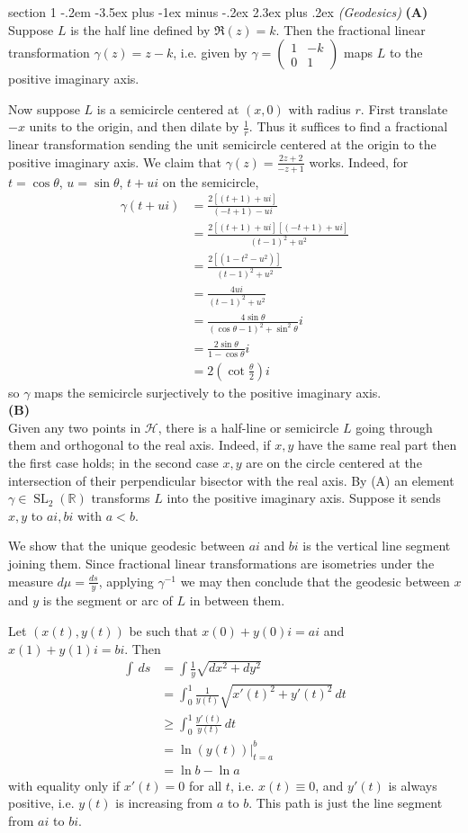 \documentclass[12pt]{article}
\makeatletter
\theoremstyle{norm}
\newcommand{\R}[0]{\mathbb{R}}
\newcommand{\rc}[1]{\frac{1}{#1}}
\newcommand{\ga}[0]{\gamma}
\newcommand{\pa}[1]{\left( {#1} \right)}
\newcommand{\subprob}[1]{\noindent\textbf{#1}\\}
\newcommand{\SL}{\operatorname{SL}}
\newenvironment{problem}{\@startsection
       {section}
       {1}
       {-.2em}
       {-3.5ex plus -1ex minus -.2ex}
       {2.3ex plus .2ex}
       {\pagebreak[3]%
       \large\bf\noindent{Problem }
       }
       }
       {%
       }
\makeatother
\begin{document}
\begin{problem}{\it (Geodesics)}
\subprob{(A)}
Suppose $L$ is the half line defined by $\Re (z)=k$. Then the fractional linear transformation $\ga(z)=z-k$, i.e. given by $\ga=\pa{\begin{smallmatrix}1&-k\\0&1\end{smallmatrix}}$ maps $L$ to the positive imaginary axis.

Now suppose $L$ is a semicircle centered at $(x,0)$ with radius $r$. First translate $-x$ units to the origin, and then dilate by $\rc r$. Thus it suffices to find a fractional linear transformation sending the unit semicircle centered at the origin to the positive imaginary axis. We claim that $\ga(z)=\frac{2z+2}{-z+1}$ works. Indeed, for $t=\cos \theta$, $u=\sin\theta$, $t+ui$ on the semicircle,
\begin{align*}
\ga(t+ui)&=\frac{2[(t+1)+ui]}{(-t+1)-ui}\\
&=\frac{2[(t+1)+ui][(-t+1)+ui]}{(t-1)^2+u^2}\\
&=\frac{2[(1-t^2-u^2)]}{(t-1)^2+u^2}\\
&=\frac{4ui}{(t-1)^2+u^2}\\
&=\frac{4\sin\theta}{(\cos\theta-1)^2+\sin^2\theta}i\\
&=\frac{2\sin\theta}{1-\cos\theta}i\\
&=2\pa{\cot\frac{\theta}{2}}i
\end{align*}
so $\ga$ maps the semicircle surjectively to the positive imaginary axis.\\

\subprob{(B)}
Given any two points in $\mathcal H$, there is a half-line or semicircle $L$ going through them and orthogonal to the real axis. Indeed, if $x,y$ have the same real part then the first case holds; in the second case $x,y$ are on the circle centered at the intersection of their perpendicular bisector with the real axis. By (A) an element $\ga\in \SL_2(\R)$ transforms $L$ into the positive imaginary axis. Suppose it sends $x,y$ to $ai,bi$ with $a<b$.

We show that the unique geodesic between $ai$ and $bi$ is the vertical line segment joining them. 
Since fractional linear transformations are isometries under the measure $d\mu=\frac{ds}{y}$, applying $\ga^{-1}$ we may then conclude that the geodesic between $x$ and $y$ is the segment or arc of $L$ in between them.

Let $(x(t),y(t))$ be such that $x(0)+y(0)i=ai$ and $x(1)+y(1)i=bi$. Then
\begin{align*}
\int\, ds&=\int\rc{y} \sqrt{dx^2+dy^2}\\
&=\int_0^1\rc{y(t)}\sqrt{x'(t)^2+y'(t)^2}\,dt\\
&\geq\int_0^1\frac{y'(t)}{y(t)}\,dt\\
&=\left.\ln(y(t))\right|^b_{t=a}\\
&=\ln b-\ln a
\end{align*}
with equality only if $x'(t)=0$ for all $t$, i.e. $x(t)\equiv 0$, and $y'(t)$ is always positive, i.e. $y(t)$ is increasing from $a$ to $b$. This path is just the line segment from $ai$ to $bi$.
\end{problem}
\end{document}
